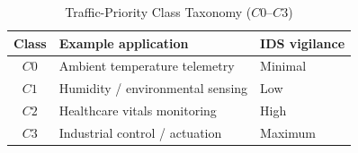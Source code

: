 \begin{table}[!t]
  \caption{Traffic-Priority Class Taxonomy ($C0$--$C3$)}
  \label{tab:traffic-classes}
  \centering
  \scriptsize
  \begin{tabular}{@{}cll@{}}
    \toprule
    \textbf{Class} & \textbf{Example application} & \textbf{IDS vigilance} \\
    \midrule
    $C0$ & Ambient temperature telemetry   & Minimal \\
    $C1$ & Humidity / environmental sensing& Low \\
    $C2$ & Healthcare vitals monitoring    & High \\
    $C3$ & Industrial control / actuation  & Maximum \\
    \bottomrule
  \end{tabular}
\end{table}
